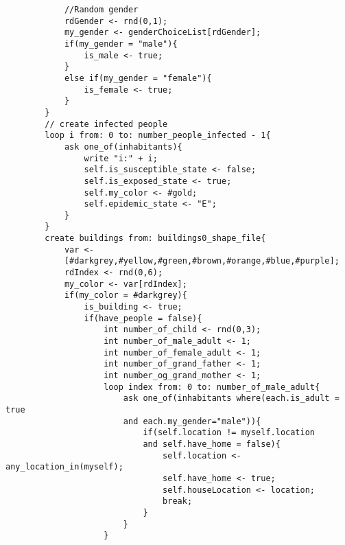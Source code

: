 \documentclass{article}
\begin{document}
\begin{tcolorbox}
\begin{lstlisting}
			//Random gender
			rdGender <- rnd(0,1);
			my_gender <- genderChoiceList[rdGender];
			if(my_gender = "male"){
				is_male <- true;
			}
			else if(my_gender = "female"){
				is_female <- true;
			}
		}
		// create infected people
		loop i from: 0 to: number_people_infected - 1{
			ask one_of(inhabitants){
				write "i:" + i;
				self.is_susceptible_state <- false;
				self.is_exposed_state <- true;
				self.my_color <- #gold;
				self.epidemic_state <- "E";
			}
		}
		create buildings from: buildings0_shape_file{
			var <- 
			[#darkgrey,#yellow,#green,#brown,#orange,#blue,#purple];
			rdIndex <- rnd(0,6);
			my_color <- var[rdIndex];
			if(my_color = #darkgrey){
				is_building <- true;
				if(have_people = false){
					int number_of_child <- rnd(0,3);
					int number_of_male_adult <- 1;
					int number_of_female_adult <- 1;
					int number_of_grand_father <- 1;
					int number_og_grand_mother <- 1;
					loop index from: 0 to: number_of_male_adult{
						ask one_of(inhabitants where(each.is_adult = true 
						and each.my_gender="male")){
							if(self.location != myself.location 
							and self.have_home = false){
								self.location <- any_location_in(myself);
								self.have_home <- true;
								self.houseLocation <- location;
								break;
							}
						}
					}
\end{lstlisting}
\end{tcolorbox}
\end{document}
